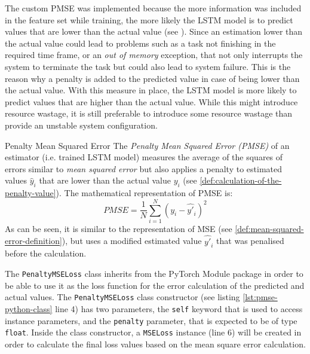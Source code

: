     The custom PMSE was implemented because the more information was included in the feature set while training, the more likely the LSTM model is to predict values that are lower than the actual value (see ). Since an estimation lower than the actual value could lead to problems such as a task not finishing in the required time frame, or an \emph{out of memory} exception, that not only interrupts the system to terminate the task but could also lead to system failure. This is the reason why a penalty is added to the predicted value in case of being lower than the actual value. With this measure in place, the LSTM model is more likely to predict values that are higher than the actual value. While this might introduce resource wastage, it is still preferable to introduce some resource wastage than provide an unstable system configuration.

    \begin{pabox}{Penalty Mean Squared Error}
      \label{def:penalty-mean-squared-error-definition}
      The \emph{Penalty Mean Squared Error (PMSE)} of an estimator (i.e. trained LSTM model) measures the average of the squares of errors similar to \emph{mean squared error} but also applies a penalty to estimated values $\hat{y}_i$ that are lower than the actual value $y_i$ (see \ref{def:calculation-of-the-penalty-value}). 
      The mathematical representation of PMSE is:
      $$PMSE = \frac{1}{N} \sum_{i = 1}^{N}\left(y_i - \hat{y'}_i\right)^2$$
      As can be seen, it is similar to the representation of MSE (see \ref{def:mean-squared-error-definition}), but uses a modified estimated value $\hat{y'}_i$ that was penalised before the calculation.
    \end{pabox}

    The \texttt{PenaltyMSELoss} class inherits from the PyTorch Module package in order to be able to use it as the loss function for the error calculation of the predicted and actual values.
    The \texttt{PenaltyMSELoss} class constructor (see listing \ref{lst:pmse-python-class} line 4) has two parameters, the \texttt{self} keyword that is used to access instance parameters, and the \texttt{penalty} parameter, that is expected to be of type \texttt{float}.
    Inside the class constructor, a \texttt{MSELoss} instance (line 6) will be created in order to calculate the final loss values based on the mean square error calculation.

    

